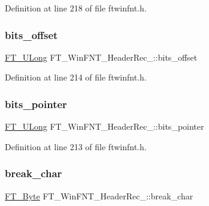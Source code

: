 Definition at line 218 of file ftwinfnt.\+h.

\mbox{\label{struct_f_t___win_f_n_t___header_rec___abcdf521978a3eb401ed6d1db20e9e16a}} 
\subsubsection{\texorpdfstring{bits\_offset}{bits\_offset}}
{\footnotesize\ttfamily \mbox{\hyperlink{fttypes_8h_a4fac88bdba78eb76b505efa6e4fbf3f5}{F\+T\+\_\+\+U\+Long}} F\+T\+\_\+\+Win\+F\+N\+T\+\_\+\+Header\+Rec\+\_\+\+::bits\+\_\+offset}



Definition at line 214 of file ftwinfnt.\+h.

\mbox{\label{struct_f_t___win_f_n_t___header_rec___aadce0638c78fbf4ec2566ea9ef49d528}} 
\subsubsection{\texorpdfstring{bits\_pointer}{bits\_pointer}}
{\footnotesize\ttfamily \mbox{\hyperlink{fttypes_8h_a4fac88bdba78eb76b505efa6e4fbf3f5}{F\+T\+\_\+\+U\+Long}} F\+T\+\_\+\+Win\+F\+N\+T\+\_\+\+Header\+Rec\+\_\+\+::bits\+\_\+pointer}



Definition at line 213 of file ftwinfnt.\+h.

\mbox{\label{struct_f_t___win_f_n_t___header_rec___a7977cbf12d386203d1b0f49ad3995e85}} 
\subsubsection{\texorpdfstring{break\_char}{break\_char}}
{\footnotesize\ttfamily \mbox{\hyperlink{fttypes_8h_a51f26183ca0c9f4af958939648caeccd}{F\+T\+\_\+\+Byte}} F\+T\+\_\+\+Win\+F\+N\+T\+\_\+\+Header\+Rec\+\_\+\+::break\+\_\+char}



